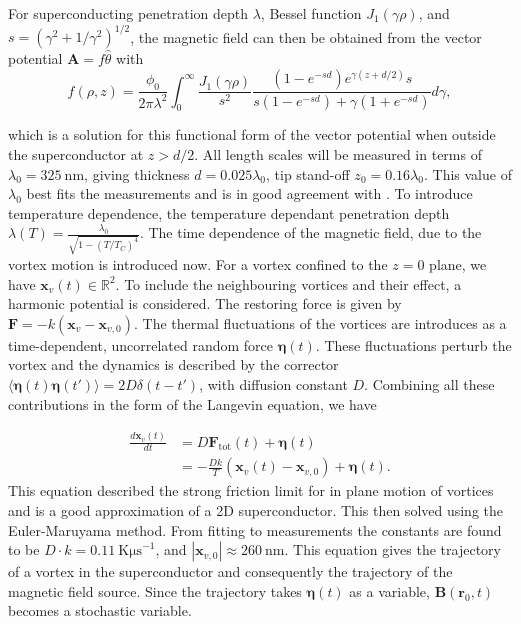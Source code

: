For superconducting penetration depth $\lambda$, Bessel function $J_1(\gamma\rho)$, and $s = (\gamma^2 + 1/\gamma^2)^{1/2}$, the magnetic field can then be obtained from the vector potential $\mathbf{A} = f\hat{\theta}$ with
\begin{equation}
    f(\rho, z) = \frac{\phi_0}{2\pi\lambda^2} \int_{0}^{\infty} \frac{J_1(\gamma\rho)}{s^2} \frac{ (1 - e^{-sd}) e^{\gamma(z + d/2)}s}{s(1 - e^{-sd}) + \gamma(1 + e^{-sd})} d\gamma ,
\end{equation}

which is a solution for this functional form of the vector potential when outside the superconductor at $z>d/2$. All length scales will be measured in terms of $\lambda_0 = \qty{325}{\nano\meter}$, giving thickness $d = 0.025\lambda_0$, tip stand-off $z_0 = 0.16\lambda_0$. This value of $\lambda_0$ best fits the measurements and is in good agreement with \citeauthor*{fridmanAnomalousThicknessDependence2025}. To introduce temperature dependence, the temperature dependant penetration depth $\lambda(T) = \frac{\lambda_0}{\sqrt{1-(T/T_C)^4}}$\cite{prozorovMagneticPenetrationDepth2006}. The time dependence of the magnetic field, due to the vortex motion is introduced now. For a vortex confined to the $z=0$ plane, we have $\mathbf{x}_v(t) \in \mathbb{R}^2$. To include the neighbouring vortices and their effect, a harmonic potential is considered. The restoring force is given by $\mathbf{F} = -k(\mathbf{x}_v - \mathbf{x}_{v,0})$. The thermal fluctuations of the vortices are introduces as a time-dependent, uncorrelated random force $\boldsymbol{\eta}(t)$. These fluctuations perturb the vortex and the dynamics is described by the corrector $\langle \boldsymbol{\eta}(t) \boldsymbol{\eta}(t') \rangle = 2D \delta(t - t')$, with diffusion constant $D$. Combining all these contributions in the form of the Langevin equation\cite{holmlundLangevinSimulationsTwodimensional1996}, we have

\begin{equation}
    \begin{split}
        \frac{d\mathbf{x}_v(t)}{dt} &= D \mathbf{F}_{\text{tot}}(t) + \boldsymbol{\eta}(t) \\
         &= -\frac{Dk}{T} \left( \mathbf{x}_v(t) - \mathbf{x}_{v,0} \right) + \boldsymbol{\eta}(t).
    \end{split}
\end{equation}
This equation described the strong friction limit for in plane motion of vortices and is a good approximation of a 2D superconductor\cite{holmlundLangevinSimulationsTwodimensional1996}. This then solved using the Euler-Maruyama method\cite{bayerDiscretizationSDEsEuler}. From fitting to measurements the constants are found to be $D\cdot k = \qty{0.11}{\kelvin\micro\second}^{-1}$, and $|\mathbf{x}_{v,0}| \approx \qty{260}{\nano\meter}$. This equation gives the trajectory of a vortex in the superconductor and consequently the trajectory of the magnetic field source. Since the trajectory takes $\boldsymbol{\eta}(t)$ as a variable, $\mathbf{B}(\mathbf{r}_0, t)$ becomes a stochastic variable.

